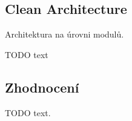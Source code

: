 
\subsection{Clean Architecture}





Architektura na úrovni modulů.

TODO text









\subsection{Zhodnocení}

TODO text.
